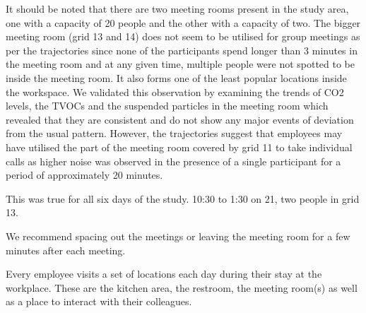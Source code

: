 \documentclass[acmtog]{acmart}
\begin{document}
It should be noted that there are two meeting rooms present in the study area, one with a capacity of 20 people and the other with a capacity of two. The bigger meeting room (grid 13 and 14) does not seem to be utilised for group meetings as per the trajectories since none of the participants spend longer than 3 minutes in the meeting room and at any given time, multiple people were not spotted to be inside the meeting room. It also forms one of the least popular locations inside the workspace. We validated this observation by examining the trends of CO2 levels, the TVOCs and the suspended particles in the meeting room which revealed that they are consistent and do not show any major events of deviation from the usual pattern. However, the trajectories suggest that employees may have utilised the part of the meeting room covered by grid 11 to take individual calls as higher noise was observed in the presence of a single participant for a period of approximately 20 minutes.

This was true for all six days of the study. 10:30 to 1:30 on 21, two people in grid 13. 

We recommend spacing out the meetings or leaving the meeting room for a few minutes after each meeting.

Every employee visits a set of locations each day during their stay at the workplace. These are the kitchen area, the restroom, the meeting room(s) as well as a place to interact with their colleagues. 
\end{document}
